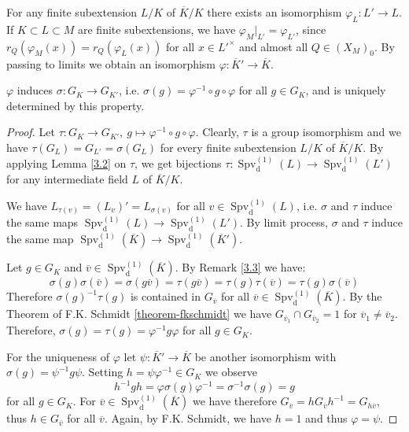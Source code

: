 \begin{remark}
For any finite subextension $L/K$ of $\overline{K}/K$ there exists an isomorphism $\varphi_L: L'\to L$. If $K\subset L\subset M$ are finite subextensions, we have $\varphi_M|_{L'} = \varphi_{L'}$, since $r_Q(\varphi_M(x)) = r_Q(\varphi_L(x))$ for all $x\in L'^\times$ and almost all $Q\in (X_M)_0$. By passing to limits we obtain an isomorphism $\varphi: \overline{K}'\to \overline{K}$.
\end{remark}

\begin{step}
$\varphi$ induces $\sigma:G_K\to G_{K'}$, i.e. $\sigma(g) = \varphi^{-1}\circ g\circ \varphi$ for all $g\in G_K$, and is uniquely determined by this property.
\end{step}

\begin{proof}
Let $\tau:G_K\to G_{K'},\ g\mapsto \varphi^{-1}\circ g\circ \varphi$. Clearly, $\tau$ is a group isomorphism and we have $\tau(G_L)=G_{L'}=\sigma(G_L)$ for every finite subextension $L/K$ of $\overline{K}/K$. By applying Lemma \ref{3.2} on $\tau$, we get bijections $\tau: \operatorname{Spv}_\text{d}^{(1)}(L)\to \operatorname{Spv}_\text{d}^{(1)}(L')$ for any intermediate field $L$ of $\overline{K}/K$.

We have $L_{\tau(v)} = (L_v)' = L_{\sigma(v)}$ for all $v\in\operatorname{Spv}_\text{d}^{(1)}(L)$, i.e. $\sigma$ and $\tau$ induce the same maps $\operatorname{Spv}_\text{d}^{(1)}(L)\to \operatorname{Spv}_\text{d}^{(1)}(L')$. By limit process, $\sigma$ and $\tau$ induce the same map $\operatorname{Spv}_\text{d}^{(1)}(\overline{K})\to \operatorname{Spv}_\text{d}^{(1)}(\overline{K}')$.

Let $g\in G_K$ and $\overline{v}\in\operatorname{Spv}_\text{d}^{(1)}(\overline{K})$. By Remark \ref{3.3} we have:
\[ \sigma(g)\sigma(\overline{v}) = \sigma(g\overline{v}) = \tau(g\overline{v}) = \tau(g)\tau(\overline{v}) = \tau(g) \sigma(\overline{v}) \]
Therefore $\sigma(g)^{-1}\tau(g)$ is contained in $G_{\overline{v}}$ for all $\overline{v}\in\operatorname{Spv}_\text{d}^{(1)}(\overline{K})$. By the Theorem of F.K. Schmidt \ref{theorem-fkschmidt} we have $G_{\overline{v}_1}\cap G_{\overline{v}_2} = 1$ for $\overline{v}_1\neq\overline{v}_2$. Therefore, $\sigma(g) = \tau(g) = \varphi^{-1}g\varphi$ for all $g\in G_K$.

For the uniqueness of $\varphi$ let $\psi: \overline{K}'\to \overline{K}$ be another isomorphism with $\sigma(g) = \psi^{-1} g \psi$. Setting $h = \psi\varphi^{-1}\in G_K$ we observe
\[ h^{-1}gh = \varphi\sigma(g)\varphi^{-1} = \sigma^{-1}\sigma(g) = g \]
for all $g\in G_K$. For $\overline{v}\in\operatorname{Spv}_\text{d}^{(1)}(\overline{K})$ we have therefore $G_{\overline{v}} = h G_{\overline{v}} h^{-1} = G_{h\overline{v}}$, thus $h\in G_{\overline{v}}$ for all $\overline{v}$. Again, by F.K. Schmidt, we have $h=1$ and thus $\varphi = \psi$.
\end{proof}
